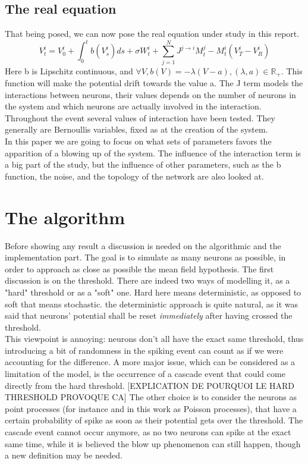\documentclass{report}
\begin{document}
\subsection{The real equation}
	That being posed, we can now pose the real equation under study in this report.\\
	\[
		V_t^i=V_0^i+\int_0^tb(V_s^i)ds+\sigma W_t^i+\sum_{j=1}^NJ^{j\rightarrow i}M_t^j-M_t^i(V_T^i-V_R^i)
	\]
	Here b is Lipschitz continuous, and $\forall V, b(V)=-\lambda(V-a), (\lambda,a)\in\mathbb{R}_+$. This function will make the potential drift towards the value a. The J term models the interactions between neurons, their values depends on the number of neurons in the system and which neurons are actually involved in the interaction. \\
	Throughout the event several values of interaction have been tested. They generally are Bernoullis variables, fixed as at the creation of the system.\\
	In this paper we are going to focus on what sets of parameters favors the apparition of a blowing up of the system. The influence of the interaction term is a big part of the study, but the influence of other parameters, such as the b function, the noise, and the topology of the network are also looked at.\\
\section{The algorithm}
	Before showing any result a discussion is needed on the algorithmic and the implementation part. The goal is to simulate as many neurons as possible, in order to approach as close as possible the mean field hypothesis. The first discussion is on the threshold. There are indeed two ways of modelling it, as a "hard" threshold or as a "soft" one. Hard here means deterministic, as opposed to soft that means stochastic. the deterministic approach is quite natural, as it was said that neurons' potential shall be reset \emph{immediately} after having crossed the threshold.\\

	This viewpoint is annoying: neurons don't all have the exact same threshold, thus introducing a bit of randomness in the spiking event can count as if we were accounting for the difference. A more major issue, which can be considered as a limitation of the model, is the occurrence of a cascade event that could come directly from the hard threshold. [EXPLICATION DE POURQUOI LE HARD THRESHOLD PROVOQUE CA]
	The other choice is to consider the neurons as point processes (for instance and in this work as Poisson processes), that have a certain probability of spike as soon as their potential gets over the threshold. The cascade event cannot occur anymore, as no two neurons can spike at the exact same time, while it is believed the blow up phenomenon can still happen, though a new definition may be needed.\\
\end{document}
